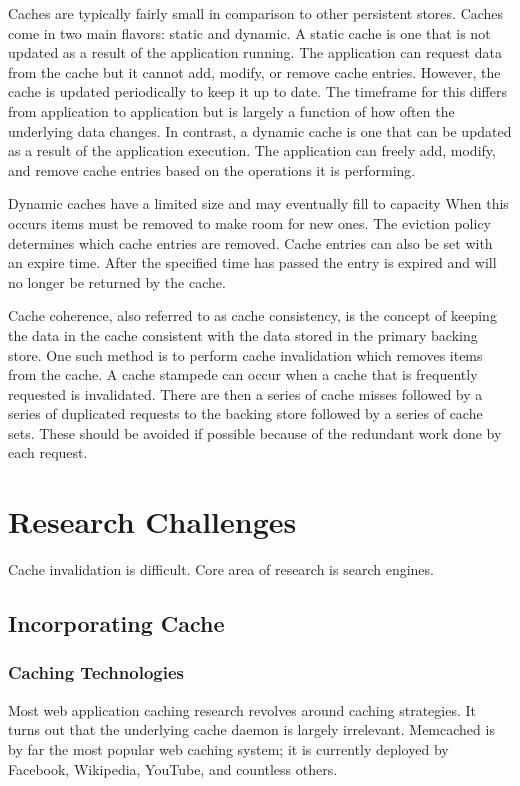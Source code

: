 \documentclass[12pt]{article}
\begin{document}
Caches are typically fairly small in comparison to other persistent stores.
Caches come in two main flavors: static and dynamic. %
A static cache is one that is not updated as a result of the application running.
The application can request data from the cache but it cannot add, modify, or remove cache entries.
However, the cache is updated periodically to keep it up to date.
The timeframe for this differs from application to application but is largely a function of how often the underlying data changes.
In contrast, a dynamic cache is one that can be updated as a result of the application execution.
The application can freely add, modify, and remove cache entries based on the operations it is performing.

Dynamic caches have a limited size and may eventually fill to capacity
When this occurs items must be removed to make room for new ones.
The eviction policy determines which cache entries are removed.
Cache entries can also be set with an expire time.
After the specified time has passed the entry is expired and will no longer be returned by the cache.

Cache coherence, also referred to as cache consistency, is the concept of keeping the data in the cache consistent with the data stored in the primary backing store.
One such method is to perform cache invalidation which removes items from the cache.
A cache stampede can occur when a cache that is frequently requested is invalidated.
There are then a series of cache misses followed by a series of duplicated requests to the backing store followed by a series of cache sets.
These should be avoided if possible because of the redundant work done by each request.

\section{Research Challenges}
Cache invalidation is difficult.
Core area of research is search engines.

\subsection{Incorporating Cache}
\subsubsection{Caching Technologies}
Most web application caching research revolves around caching strategies.
It turns out that the underlying cache daemon is largely irrelevant.
Memcached is by far the most popular web caching system; it is currently deployed by Facebook, Wikipedia, YouTube, and countless others.\cite{memcachedDotOrg}
\end{document}
